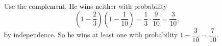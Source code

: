 Use the complement. He wins neither with probability
\[
\left(1-\dfrac{2}{3}\right)\left(1-\dfrac{1}{10}\right)=\dfrac{1}{3}\cdot\dfrac{9}{10}=\dfrac{3}{10},
\]
by independence. So he wins at least one with probability $1-\dfrac{3}{10}=\boxed{\dfrac{7}{10}}$.
